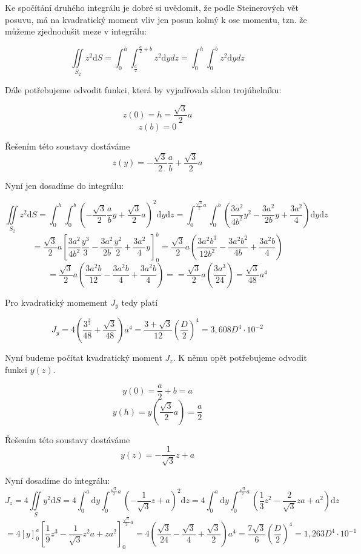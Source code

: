 \documentclass{article}
\begin{document}
Ke spočítání druhého integrálu je dobré si uvědomit, že podle Steinerových vět posuvu, má na kvadratický moment vliv jen posun kolmý k ose momentu, tzn. že můžeme zjednodušit meze v integrálu:

\[ \iint\limits_{S_2} z^2\mathrm{d}S = \int_{0}^{h}\mathrm \int_{\frac{a}{2}}^{\frac{a}{2}+b} z^2 \mathrm {d}y{d}z = \int_{0}^{h}\mathrm \int_{0}^{b} z^2 \mathrm {d}y{d}z\] 

Dále potřebujeme odvodit funkci, která by vyjadřovala sklon trojúhelníku:

\[ z(0)=h=\frac{\sqrt{3}}{2}a \] 
\[ z(b)=0 \]

Řešením této soustavy dostáváme
\[ z(y)=-\frac{\sqrt{3}}{2}\frac{a}{b}+\frac{\sqrt{3}}{2}a \]

Nyní jen dosadíme do integrálu:

\[ \iint\limits_{S_2} z^2\mathrm{d}S = \int_{0}^{h} \int_{0}^{b} \left(-\frac{\sqrt{3}}{2}\frac{a}{b}y+\frac{\sqrt{3}}{2}a\right)^2 \mathrm{d}y \mathrm{d}z 
= \int_{0}^{\frac{\sqrt{3}}{2}a} \int_{0}^{b} \left(\frac{3a^2}{4b^2}y^2 - \frac{3a^2}{2b}y + \frac{3a^2}{4}\right) \mathrm{d}y \mathrm{d}z \]
\[= \frac{\sqrt{3}}{2}a \left[ \frac{3a^2}{4b^2} \frac{y^3}{3} - \frac{3a^2}{2b} \frac{y^2}{2} + \frac{3a^2}{4} y \right]_{0}^{b}
= \frac{\sqrt{3}}{2}a \left( \frac{3a^2 b^3}{12b^2} - \frac{3a^2 b^2}{4b} + \frac{3a^2 b}{4} \right)\]  
\[= \frac{\sqrt{3}}{2}a \left( \frac{3a^2 b}{12} - \frac{3a^2 b}{4} + \frac{3a^2 b}{4} \right)
=  = \frac{\sqrt{3}}{2}a \left( \frac{3a^3}{24} \right) = \frac{\sqrt{3}}{48} a^4\]

Pro kvadratický momement $J_y$ tedy platí

\[ J_y= 4 \left( \frac{3^{\frac{3}{2}}}{48} + \frac{\sqrt{3}}{48} \right) a^4 = \frac{3+\sqrt{3}}{12} \left( \frac{D}{2}\right)^4 = 3,608 D^4 \cdot10^{-2}\]

Nyní budeme počítat kvadratický moment $J_z$. K němu opět potřebujeme odvodit funkci $y(z)$.

\[ y(0)=\frac{a}{2}+b = a\] 
\[ y(h)=y\left(\frac{\sqrt{3}}{2}a\right)=\frac{a}{2}\]

Řešením této soustavy dostáváme
\[ y(z)=-\frac{1}{\sqrt{3}}z+a \]

Nyní dosadíme do integrálu:
\[ J_z=4\iint\limits_{S} y^2\mathrm{d}S = 4\int_{0}^{a}\mathrm{d}y \int_{0}^{\frac{\sqrt{3}}{2}a} \left(-\frac{1}{\sqrt{3}}z+a\right)^2\mathrm{d}z 
= 4\int_{0}^{a}\mathrm{d}y \int_{0}^{\frac{\sqrt{3}}{2}a} \left(\frac{1}{3}z^2-\frac{2}{\sqrt{3}}za+a^2\right)\mathrm{d}z\]
\[= 4\left[ y\right]_0^{a} \left[ \frac{1}{9}z^3-\frac{1}{\sqrt{3}}z^2a+za^2\right]_0^{\frac{\sqrt{3}}{2}a} = 4\left(\frac{\sqrt{3}}{24} -\frac{\sqrt{3}}{4}+ \frac{\sqrt{3}}{2}\right)a^4
= \frac{7\sqrt{3}}{6} \left(\frac{D}{2}\right)^4= 1,263 D^4 \cdot 10^{-1}\]
\end{document}
